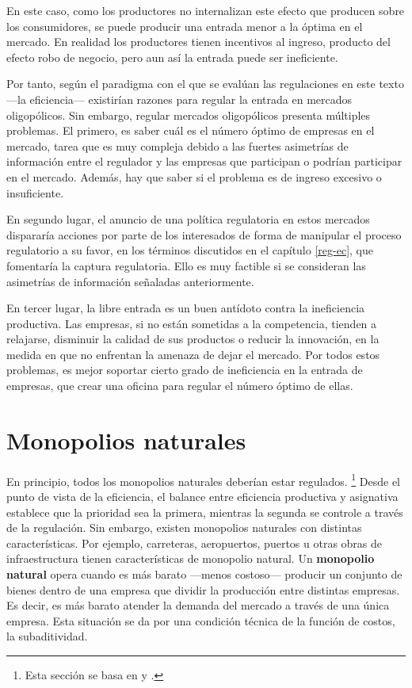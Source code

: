 \documentclass[
  12pt,
  spanish,
]{book}
\begin{document}
En este caso, como los productores no internalizan este efecto que producen sobre los consumidores, se puede producir una entrada menor a la óptima en el mercado. En realidad los productores tienen incentivos al ingreso, producto del efecto robo de negocio, pero aun así la entrada puede ser ineficiente.

Por tanto, según el paradigma con el que se evalúan las regulaciones en este texto ---la eficiencia--- existirían razones para regular la entrada en mercados oligopólicos. Sin embargo, regular mercados oligopólicos presenta múltiples problemas. El primero, es saber cuál es el número óptimo de empresas en el mercado, tarea que es muy compleja debido a las fuertes asimetrías de información entre el regulador y las empresas que participan o podrían participar en el mercado. Además, hay que saber si el problema es de ingreso excesivo o insuficiente.

En segundo lugar, el anuncio de una política regulatoria en estos mercados dispararía acciones por parte de los interesados de forma de manipular el proceso regulatorio a su favor, en los términos discutidos en el capítulo \ref{reg-ec}, que fomentaría la captura regulatoria. Ello es muy factible si se consideran las asimetrías de información señaladas anteriormente.

En tercer lugar, la libre entrada es un buen antídoto contra la ineficiencia productiva. Las empresas, si no están sometidas a la competencia, tienden a relajarse, disminuir la calidad de sus productos o reducir la innovación, en la medida en que no enfrentan la amenaza de dejar el mercado. Por todos estos problemas, es mejor soportar cierto grado de ineficiencia en la entrada de empresas, que crear una oficina para regular el número óptimo de ellas.

\hypertarget{monop-nat}{%
\section{Monopolios naturales}\label{monop-nat}}

En principio, todos los monopolios naturales deberían estar regulados.
\footnote{Esta sección se basa en \citet{Viscusi2005} y \citet{Joskow2007}.}
Desde el punto de vista de la eficiencia, el balance entre eficiencia productiva y asignativa establece que la prioridad sea la primera, mientras la segunda se controle a través de la regulación. Sin embargo, existen monopolios naturales con distintas características. Por ejemplo, carreteras, aeropuertos, puertos u otras obras de infraestructura tienen características de monopolio natural. Un \textbf{monopolio natural} opera cuando es más barato ---menos costoso--- producir un conjunto de bienes dentro de una empresa que dividir la producción entre distintas empresas. Es decir, es más barato atender la demanda del mercado a través de una única empresa. Esta situación se da por una condición técnica de la función de costos, la subaditividad.
\end{document}
